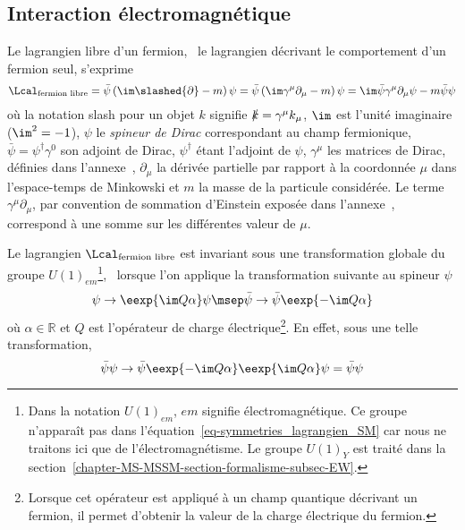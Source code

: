 \subsection{Interaction électromagnétique}\label{chapter-MS-MSSM-section-formalisme-subsec-QED}
Le lagrangien libre d'un fermion, \ie\ le lagrangien décrivant le comportement d'un fermion seul, s'exprime
\begin{equation}
\Lcal_{\text{fermion libre}}
= \bar{\psi} \left( \im\slashed{\partial} - m \right) \psi
= \bar{\psi} \left( \im \gamma^\mu\partial_\mu - m \right) \psi
= \im \bar{\psi} \gamma^\mu\partial_\mu \psi - m \bar{\psi}\psi
\label{eq-lagrangien_fermion_libre_partial}
\end{equation}
où la notation \og slash \fg{} pour un objet $k$ signifie $\slashed{k} = \gamma^\mu k_\mu$, $\im$ est l'unité imaginaire ($\im^2=-1$), $\psi$ le \emph{spineur de Dirac} correspondant au champ fermionique, $\bar{\psi}=\psi^\dagger\gamma^0$ son adjoint de Dirac, $\psi^\dagger$ étant l'adjoint de $\psi$, $\gamma^\mu$ les matrices de Dirac, définies dans l'annexe~, $\partial_\mu$ la dérivée partielle par rapport à la coordonnée $\mu$ dans l'espace-temps de Minkowski et $m$ la masse de la particule considérée.
Le terme $\gamma^\mu \partial_\mu$, par convention de sommation d'Einstein exposée dans l'annexe~, correspond à une somme sur les différentes valeur de $\mu$.
\par Le lagrangien $\Lcal_{\text{fermion libre}}$ est invariant sous une transformation globale du groupe $U(1)_{em}$\footnote{Dans la notation $U(1)_{em}$, \og $em$ \fg{} signifie électromagnétique. Ce groupe n'apparaît pas dans l'équation~\eqref{eq-symmetries_lagrangien_SM} car nous ne traitons ici que de l'électromagnétisme. Le groupe $U(1)_Y$ est traité dans la section~\ref{chapter-MS-MSSM-section-formalisme-subsec-EW}.}, \ie\ lorsque l'on applique la transformation suivante au spineur $\psi$
\begin{equation}
\psi \to \eexp{\im Q\alpha}\psi
\msep
\bar{\psi} \to \bar{\psi}\eexp{-\im Q\alpha}
\end{equation}
où $\alpha\in\mathbb{R}$ et $Q$ est l'opérateur de charge électrique\footnote{Lorsque cet opérateur est appliqué à un champ quantique décrivant un fermion, il permet d'obtenir la valeur de la charge électrique du fermion.}.
En effet, sous une telle transformation,
\begin{equation}
\bar{\psi}\psi \to \bar{\psi}\eexp{-\im Q\alpha}\eexp{\im Q\alpha}\psi = \bar{\psi}\psi
\label{eq-chapter-MS-MSSM-section-formalisme-subsec-QED-tr_jauge-spineur}
\end{equation}
